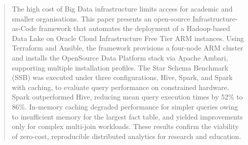 \begin{abstract}
The high cost of Big Data infrastructure limits access for academic and smaller
organisations. This paper presents an open-source Infrastructure-as-Code
framework that automates the deployment of a Hadoop-based Data Lake on Oracle
Cloud Infrastructure Free Tier ARM instances. Using Terraform and Ansible, the
framework provisions a four-node ARM cluster and installs the OpenSource Data
Platform stack via Apache Ambari, supporting multiple installation profiles. The
Star Schema Benchmark (SSB) was executed under three
configurations, Hive, Spark, and Spark with caching, to evaluate query
performance on constrained hardware. Spark outperformed Hive, reducing mean query
execution times by 52\% to 86\%. In-memory caching degraded performance for
simpler queries owing to insufficient memory for the largest fact table, and
yielded improvements only for complex multi-join workloads. These results confirm
the viability of zero-cost, reproducible distributed analytics for research and
education.
\end{abstract}

